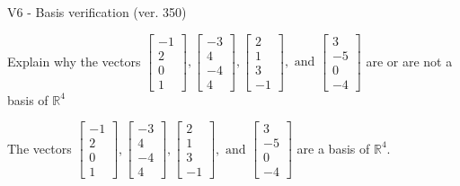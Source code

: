 \begin{exercise}
  \begin{exerciseTitle}V6 - Basis verification (ver. 350)\end{exerciseTitle}
  \begin{exerciseStatement}
    Explain why the vectors \(\left[\begin{array}{r}
-1 \\
2 \\
0 \\
1
\end{array}\right] , \left[\begin{array}{r}
-3 \\
4 \\
-4 \\
4
\end{array}\right] , \left[\begin{array}{r}
2 \\
1 \\
3 \\
-1
\end{array}\right] , \text{ and } \left[\begin{array}{r}
3 \\
-5 \\
0 \\
-4
\end{array}\right]\) are or are not a basis of \(\mathbb{R}^4\)	


  \end{exerciseStatement}
  \begin{exerciseAnswer}
   The vectors \(\left[\begin{array}{r}
-1 \\
2 \\
0 \\
1
\end{array}\right] , \left[\begin{array}{r}
-3 \\
4 \\
-4 \\
4
\end{array}\right] , \left[\begin{array}{r}
2 \\
1 \\
3 \\
-1
\end{array}\right] , \text{ and } \left[\begin{array}{r}
3 \\
-5 \\
0 \\
-4
\end{array}\right]\) 
  	 are  a basis of \(\mathbb{R}^4\).
  


  \end{exerciseAnswer}
\end{exercise}